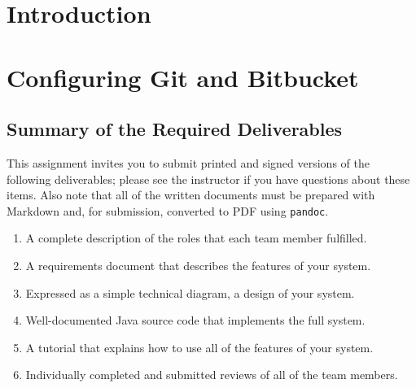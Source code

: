 

\usepackage[compact]{titlesec}



\section*{Introduction}


\section*{Configuring Git and Bitbucket}

\subsection*{Summary of the Required Deliverables}

This assignment invites you to submit printed and signed versions of the following deliverables; please see the
instructor if you have questions about these items. Also note that all of the written documents must be prepared with
Markdown and, for submission, converted to PDF using {\tt pandoc}.


\vspace*{-.1in}
\begin{enumerate}
  \setlength{\itemsep}{0in}
  \item A complete description of the roles that each team member fulfilled.
  \item A requirements document that describes the features of your system.
  \item Expressed as a simple technical diagram, a design of your system.
  \item Well-documented Java source code that implements the full system.
  \item A tutorial that explains how to use all of the features of your system.
  \item Individually completed and submitted reviews of all of the team members.
\end{enumerate}
\vspace*{-.1in}


